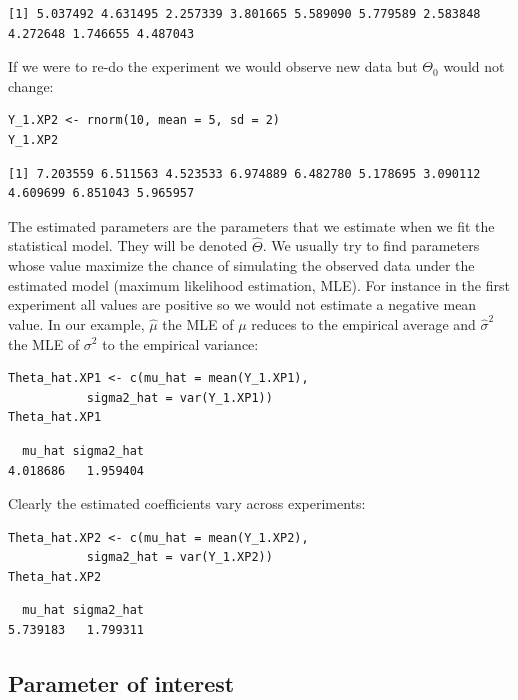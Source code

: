 \documentclass{article}
\begin{document}
\begin{verbatim}
[1] 5.037492 4.631495 2.257339 3.801665 5.589090 5.779589 2.583848 4.272648 1.746655 4.487043
\end{verbatim}

If we were to re-do the experiment we would observe new data but \(\Theta_0\) would not change:
\lstset{language=r,label= ,caption= ,captionpos=b,numbers=none}
\begin{lstlisting}
Y_1.XP2 <- rnorm(10, mean = 5, sd = 2)
Y_1.XP2
\end{lstlisting}

\begin{verbatim}
[1] 7.203559 6.511563 4.523533 6.974889 6.482780 5.178695 3.090112 4.609699 6.851043 5.965957
\end{verbatim}

The estimated parameters are the parameters that we estimate when we
fit the statistical model. They will be denoted \(\hat{\Theta}\). We
usually try to find parameters whose value maximize the chance of
simulating the observed data under the estimated model (maximum
likelihood estimation, MLE). For instance in the first experiment all
values are positive so we would not estimate a negative mean value. In
our example, \(\hat{\mu}\) the MLE of \(\mu\) reduces to the empirical
average and \(\hat{\sigma}^2\) the MLE of \(\sigma^2\) to the
empirical variance:
\lstset{language=r,label= ,caption= ,captionpos=b,numbers=none}
\begin{lstlisting}
Theta_hat.XP1 <- c(mu_hat = mean(Y_1.XP1),
		   sigma2_hat = var(Y_1.XP1))
Theta_hat.XP1
\end{lstlisting}

\begin{verbatim}
  mu_hat sigma2_hat 
4.018686   1.959404
\end{verbatim}

Clearly the estimated coefficients vary across experiments:
\lstset{language=r,label= ,caption= ,captionpos=b,numbers=none}
\begin{lstlisting}
Theta_hat.XP2 <- c(mu_hat = mean(Y_1.XP2),
		   sigma2_hat = var(Y_1.XP2))
Theta_hat.XP2
\end{lstlisting}

\begin{verbatim}
  mu_hat sigma2_hat 
5.739183   1.799311
\end{verbatim}

\subsection{Parameter of interest}
\label{sec:org9b368dd}
\end{document}
